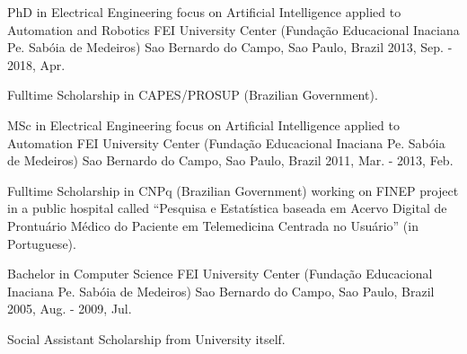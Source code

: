 

\begin{cventries}

  \cventry
    {PhD in Electrical Engineering focus on Artificial Intelligence applied to Automation and Robotics}
    {FEI University Center (Fundação Educacional Inaciana Pe. Sabóia de Medeiros)} %
    {Sao Bernardo do Campo, Sao Paulo, Brazil} %
    {2013, Sep. - 2018, Apr.}
    {
          \begin{cvitems} %
            \item {Fulltime Scholarship in CAPES/PROSUP (Brazilian Government).}
          \end{cvitems}
    }

  \cventry
    {MSc in Electrical Engineering focus on Artificial Intelligence applied to Automation}
    {FEI University Center (Fundação Educacional Inaciana Pe. Sabóia de Medeiros)} %
    {Sao Bernardo do Campo, Sao Paulo, Brazil} %
    {2011, Mar. - 2013, Feb.}
    {
          \begin{cvitems} %
            \item {Fulltime Scholarship in CNPq (Brazilian Government) working on FINEP project in a public hospital called ``Pesquisa e Estatística baseada em Acervo Digital de Prontuário Médico do Paciente em Telemedicina Centrada no Usuário'' (in Portuguese).}
          \end{cvitems}
    }

  \cventry
    {Bachelor in Computer Science} %
    {FEI University Center (Fundação Educacional Inaciana Pe. Sabóia de Medeiros)} %
    {Sao Bernardo do Campo, Sao Paulo, Brazil} %
    {2005, Aug. - 2009, Jul.} %
    {
            \begin{cvitems} %
              \item {Social Assistant Scholarship from University itself.}
            \end{cvitems}
    }

\end{cventries}
